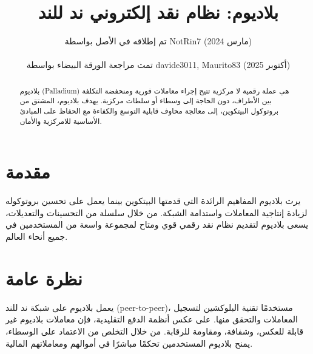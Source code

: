 \documentclass[11pt,a4paper]{article}
\title{\textbf{بلاديوم: نظام نقد إلكتروني ند للند}}
\author{تم إطلاقه في الأصل بواسطة NotRin7 (مارس 2024) \\\\ تمت مراجعة الورقة البيضاء بواسطة davide3011, Maurito83 (أكتوبر 2025)}
\date{}
\begin{document}
\maketitle

\begin{abstract}
بلاديوم (Palladium) هي عملة رقمية لا مركزية تتيح إجراء معاملات فورية ومنخفضة التكلفة بين الأطراف، دون الحاجة إلى وسطاء أو سلطات مركزية. يهدف بلاديوم، المشتق من بروتوكول البيتكوين، إلى معالجة مخاوف قابلية التوسع والكفاءة مع الحفاظ على المبادئ الأساسية للامركزية والأمان.
\end{abstract}

\section{مقدمة}
يرث بلاديوم المفاهيم الرائدة التي قدمتها البيتكوين بينما يعمل على تحسين بروتوكوله لزيادة إنتاجية المعاملات واستدامة الشبكة. من خلال سلسلة من التحسينات والتعديلات، يسعى بلاديوم لتقديم نظام نقد رقمي قوي ومتاح لمجموعة واسعة من المستخدمين في جميع أنحاء العالم.

\section{نظرة عامة}
يعمل بلاديوم على شبكة ند للند (peer-to-peer)، مستخدمًا تقنية البلوكشين لتسجيل المعاملات والتحقق منها. على عكس أنظمة الدفع التقليدية، فإن معاملات بلاديوم غير قابلة للعكس، وشفافة، ومقاومة للرقابة. من خلال التخلص من الاعتماد على الوسطاء، يمنح بلاديوم المستخدمين تحكمًا مباشرًا في أموالهم ومعاملاتهم المالية.
\end{document}
